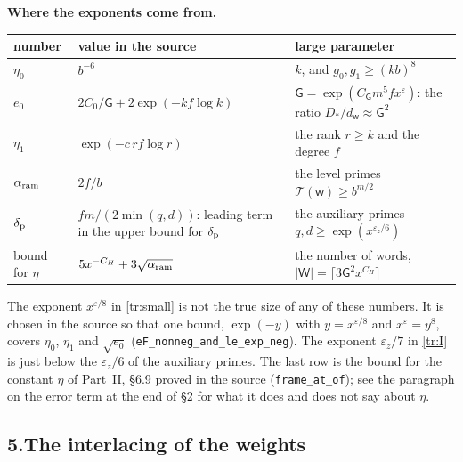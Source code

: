 \documentclass[11pt,letterpaper]{article}
\begin{document}
\textbf{Where the exponents come from.}
\begin{center}\small
\begin{tabular}{lp{}p{}}
\toprule
number & value in the source & large parameter\\
\midrule
$\eta_0$ & $b^{-6}$ & $k$, and $g_0,g_1\ge(kb)^8$\\
$e_0$ & $2C_0/\mathsf G+2\exp(-kf\log k)$ & $\mathsf G=\exp(C_{\mathsf G}m^5fx^\varepsilon)$: the ratio $D_*/d_{\mathsf w}\approx\mathsf G^2$\\
$\eta_1$ & $\exp(-c\,rf\log r)$ & the rank $r\ge k$ and the degree $f$\\
$\alpha_{\rm ram}$ & $2f/b$ & the level primes $\mathcal T(\mathsf w)\ge b^{m/2}$\\
$\delta_{\rm p}$ & $fm/(2\min(q,d))$: leading term in the upper bound for $\delta_{\rm p}$ & the auxiliary primes $q,d\ge\exp(x^{\varepsilon_z/6})$\\
bound for $\eta$ & $5x^{-C_H}+3\sqrt{\alpha_{\rm ram}}$ & the number of words, $|\mathsf W|=\lceil3\mathsf G^2x^{C_H}\rceil$\\
\bottomrule
\end{tabular}
\end{center}
The exponent $x^{\varepsilon/8}$ in \eqref{tr:small} is not the true size of any of these numbers. It is
chosen in the source so that one bound, $\exp(-y)$ with $y=x^{\varepsilon/8}$ and $x^\varepsilon=y^8$, covers
$\eta_0$, $\eta_1$ and $\sqrt{e_0}$ (\texttt{eF\_nonneg\_and\_le\_exp\_neg}). The exponent $\varepsilon_z/7$ in
\eqref{tr:I} is just below the $\varepsilon_z/6$ of the auxiliary primes. The last row is the bound for the constant $\eta$ of Part~II, \S6.9 proved in the
source (\texttt{frame\_at\_of}); see the paragraph on the error term at the end of \S2 for what it does and does not say about $\eta$.

\subsection*{5.\quad The interlacing of the weights}
\end{document}
